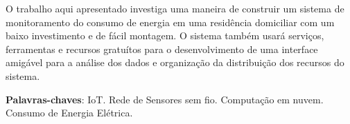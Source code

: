 \setlength{\absparsep}{18pt} %
\begin{resumo}
 O trabalho aqui apresentado investiga uma maneira de construir um sistema de monitoramento do consumo de energia em uma residência domiciliar com um baixo investimento e de fácil montagem. O sistema também usará serviços, ferramentas e recursos gratuítos para o desenvolvimento de uma interface amigável para a análise dos dados e organização da distribuição dos recursos do sistema.

 \textbf{Palavras-chaves}: IoT. Rede de Sensores sem fio. Computação em nuvem. Consumo de Energia Elétrica.
\end{resumo}
